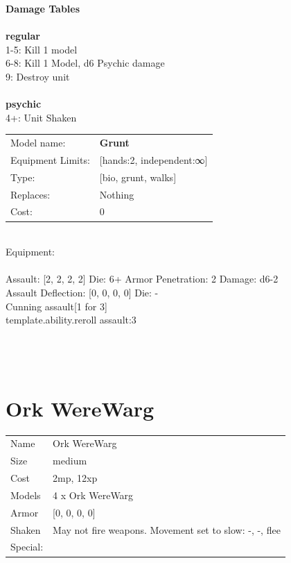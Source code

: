 {\bf Damage Tables} \\
\ \\ {\bf regular } \\
1-5: Kill 1 model \\
6-8: Kill 1 Model, d6 Psychic damage \\
9: Destroy unit \\
\ \\ {\bf psychic } \\
4+: Unit Shaken \\


\noindent
\begin{tabular}{ll}
Model name: &{\bf Grunt } \\
Equipment Limits: &[hands:2, independent:∞] \\
Type: &[bio, grunt, walks] \\
Replaces: &Nothing \\
Cost: & 0\\
\end{tabular}
\ \\
Equipment:  \\
\ \\
Assault: [2, 2, 2, 2] Die: 6+ Armor Penetration: 2 Damage: d6-2 \\
Assault Deflection: [0, 0, 0, 0] Die: -\\
\indent Cunning assault[1 for 3]\\ 
{template.ability.reroll assault:3}\\ 
 
\ \\

\ \\
 
\ \\













\clearpage

\section{ Ork WereWarg }

\begin{tabular}{ll}
  Name & Ork WereWarg \\
  Size & medium\\
  Cost & 2mp, 12xp\\
  Models & 4 x Ork WereWarg\\
  Armor & [0, 0, 0, 0]\\
  Shaken & May not fire weapons. Movement set to slow: -, -, flee\\
  Special: \\
\end{tabular}

